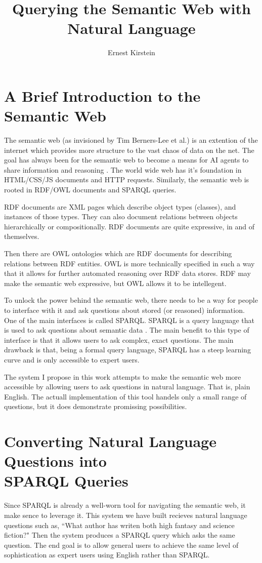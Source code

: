 \documentclass[11pt]{article}
\begin{document}
\title{Querying the Semantic Web with Natural Language}
\author{Ernest Kirstein}
\maketitle

\tableofcontents

\section{A Brief Introduction to the Semantic Web}
The semantic web (as invisioned by Tim Berners-Lee et al.) is an extention of
the internet which provides more structure to the vast chaos of data on the
net. The goal has always been for the semantic web to become
a means for AI agents to share information and reasoning \cite{semantic}.
The world wide web has it's foundation in HTML/CSS/JS documents and HTTP requests.
Similarly, the semantic web is rooted in RDF/OWL documents and SPARQL queries.

RDF documents are XML pages which
describe object types (classes), and instances of those types. 
They can also document relations between objects hierarchically or compositionally. 
RDF documents are quite expressive, in and of themselves. 

Then there are OWL ontologies which are RDF documents for describing relations
between RDF entities\cite{owl}. OWL is more technically specified in such a
way that it allows for further automated reasoning
over RDF data stores. RDF may make the semantic web expressive, but OWL
allows it to be intellegent.

To unlock the power behind the semantic web, there needs to be a way for people
to interface with it and ask questions about stored (or reasoned) information. 
One of the main interfaces is called SPARQL. 
SPARQL is a query language that is used to ask questions about semantic
data \cite{sparql}. The main benefit to this type of interface is that it allows users to ask
complex, exact questions. The main drawback is that, being a formal query language,
SPARQL has a steep learning curve and is only accessible to expert users.

The system I propose in this work attempts to make the semantic web more accessible
by allowing users to ask questions in natural language. That is, plain English.
The actuall implementation of this tool handels only a small range of questions,
but it does demonstrate promissing possibilities.

\section{Converting Natural Language Questions into \\SPARQL Queries}
Since SPARQL is already a well-worn tool for navigating the semantic
web, it make sence to leverage it. This system we have built recieves natural language
questions such as, ``What author has writen both high fantasy and science fiction?"
Then the system produces a SPARQL query which asks the same question. 
The end goal is to allow general users to achieve the same level of sophistication
as expert users using English rather than SPARQL.
\end{document}

